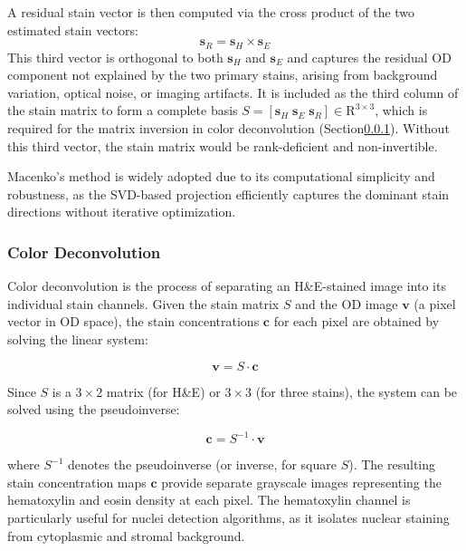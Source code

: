 A residual stain vector is then computed via the cross product of the two estimated stain vectors:
\begin{equation}
    \mathbf{s}_R = \mathbf{s}_H \times \mathbf{s}_E
\end{equation}
This third vector is orthogonal to both $\mathbf{s}_H$ and $\mathbf{s}_E$ and captures the residual OD component not explained by the two primary stains, arising from background variation, optical noise, or imaging artifacts. It is included as the third column of the stain matrix to form a complete basis $S = [\mathbf{s}_H \; \mathbf{s}_E \; \mathbf{s}_R] \in \mathrm{R}^{3 \times 3}$, which is required for the matrix inversion in color deconvolution (Section\ref{sec:color-deconvolution}). Without this third vector, the stain matrix would be rank-deficient and non-invertible.

Macenko's method is widely adopted due to its computational simplicity and robustness, as the SVD-based projection efficiently captures the dominant stain directions without iterative optimization.

\subsubsection{Color Deconvolution}
\label{sec:color-deconvolution}

Color deconvolution is the process of separating an H\&E-stained image into its individual stain channels. Given the stain matrix $S$ and the OD image $\mathbf{v}$ (a pixel vector in OD space), the stain concentrations $\mathbf{c}$ for each pixel are obtained by solving the linear system:

\begin{equation}
	\mathbf{v} = S \cdot \mathbf{c}
\end{equation}

Since $S$ is a $3 \times 2$ matrix (for H\&E) or $3 \times 3$ (for three stains), the system can be solved using the pseudoinverse:

\begin{equation}
	\mathbf{c} = S^{-1} \cdot \mathbf{v}
\end{equation}

where $S^{-1}$ denotes the pseudoinverse (or inverse, for square $S$). The resulting stain concentration maps $\mathbf{c}$ provide separate grayscale images representing the hematoxylin and eosin density at each pixel. The hematoxylin channel is particularly useful for nuclei detection algorithms, as it isolates nuclear staining from cytoplasmic and stromal background.

